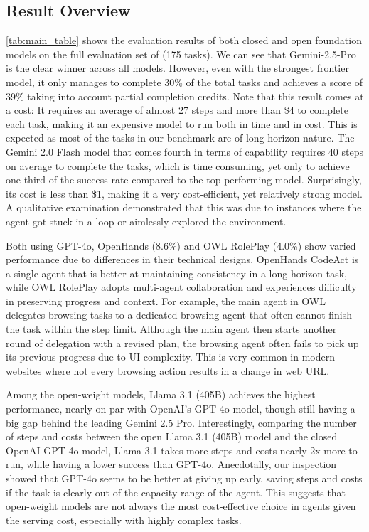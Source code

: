 \documentclass{article}
\begin{document}
\subsection{Result Overview}
\vspace{-1mm}
\autoref{tab:main_table} shows the evaluation results of both closed and open foundation models on the full evaluation set of \tac (175 tasks).
We can see that Gemini-2.5-Pro is the clear winner across all models.
However, even with the strongest frontier model, it only manages to complete 30\% of the total tasks and achieves a score of 39\% taking into account partial completion credits. 
Note that this result comes at a cost: It requires an average of almost 27 steps and more than \$4 to complete each task, making it an expensive model to run both in time and in cost.
This is expected as most of the tasks in our benchmark are of long-horizon nature.
The Gemini 2.0 Flash model that comes fourth in terms of capability requires 40 steps on average to complete the tasks, which is time consuming, yet only to achieve one-third of the success rate compared to the top-performing model.
Surprisingly, its cost is less than \$1, making it a very cost-efficient, yet relatively strong model.
A qualitative examination demonstrated that this was due to instances where the agent got stuck in a loop or aimlessly explored the environment.

Both using GPT-4o, OpenHands (8.6\%) and OWL RolePlay (4.0\%) show varied performance due to differences in their technical designs. OpenHands CodeAct is a single agent that is better at maintaining consistency in a long-horizon task, while OWL RolePlay adopts multi-agent collaboration and experiences difficulty in preserving progress and context. For example, the main agent in OWL delegates browsing tasks to a dedicated browsing agent that often cannot finish the task within the step limit. Although the main agent then starts another round of delegation with a revised plan, the browsing agent often fails to pick up its previous progress due to UI complexity. This is very common in modern websites where not every browsing action results in a change in web URL.

Among the open-weight models, Llama 3.1 (405B) achieves the highest performance, nearly on par with OpenAI's GPT-4o model, though still having a big gap behind the leading Gemini 2.5 Pro.
Interestingly, comparing the number of steps and costs between the open Llama 3.1 (405B) model and the closed OpenAI GPT-4o model, Llama 3.1 takes more steps and costs nearly 2x more to run, while having a lower success than GPT-4o.
Anecdotally, our inspection showed that GPT-4o seems to be better at giving up early, saving steps and costs if the task is clearly out of the capacity range of the agent.
This suggests that open-weight models are not always the most cost-effective choice in agents given the serving cost, especially with highly complex tasks.
\end{document}
